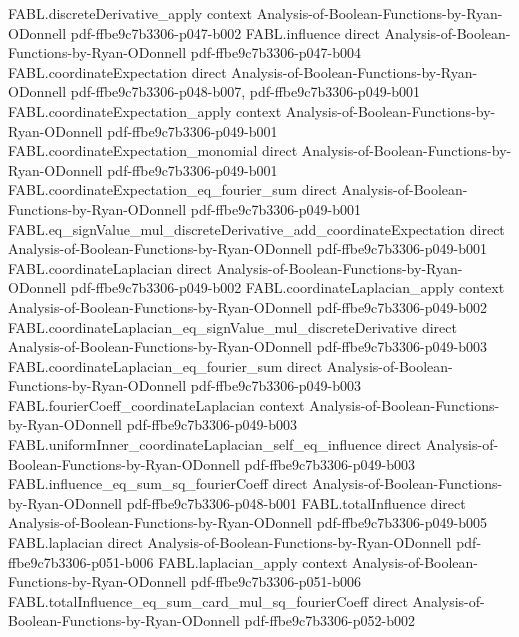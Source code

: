 \begin{theorem}
\proofstep
  {FABL.discreteDerivative_apply}
  {context}
  {Analysis-of-Boolean-Functions-by-Ryan-ODonnell}
  {pdf-ffbe9c7b3306-p047-b002}
\proofstep
  {FABL.influence}
  {direct}
  {Analysis-of-Boolean-Functions-by-Ryan-ODonnell}
  {pdf-ffbe9c7b3306-p047-b004}
\proofstep
  {FABL.coordinateExpectation}
  {direct}
  {Analysis-of-Boolean-Functions-by-Ryan-ODonnell}
  {pdf-ffbe9c7b3306-p048-b007,
    pdf-ffbe9c7b3306-p049-b001}
\proofstep
  {FABL.coordinateExpectation_apply}
  {context}
  {Analysis-of-Boolean-Functions-by-Ryan-ODonnell}
  {pdf-ffbe9c7b3306-p049-b001}
\proofstep
  {FABL.coordinateExpectation_monomial}
  {direct}
  {Analysis-of-Boolean-Functions-by-Ryan-ODonnell}
  {pdf-ffbe9c7b3306-p049-b001}
\proofstep
  {FABL.coordinateExpectation_eq_fourier_sum}
  {direct}
  {Analysis-of-Boolean-Functions-by-Ryan-ODonnell}
  {pdf-ffbe9c7b3306-p049-b001}
\proofstep
  {FABL.eq_signValue_mul_discreteDerivative_add_coordinateExpectation}
  {direct}
  {Analysis-of-Boolean-Functions-by-Ryan-ODonnell}
  {pdf-ffbe9c7b3306-p049-b001}
\proofstep
  {FABL.coordinateLaplacian}
  {direct}
  {Analysis-of-Boolean-Functions-by-Ryan-ODonnell}
  {pdf-ffbe9c7b3306-p049-b002}
\proofstep
  {FABL.coordinateLaplacian_apply}
  {context}
  {Analysis-of-Boolean-Functions-by-Ryan-ODonnell}
  {pdf-ffbe9c7b3306-p049-b002}
\proofstep
  {FABL.coordinateLaplacian_eq_signValue_mul_discreteDerivative}
  {direct}
  {Analysis-of-Boolean-Functions-by-Ryan-ODonnell}
  {pdf-ffbe9c7b3306-p049-b003}
\proofstep
  {FABL.coordinateLaplacian_eq_fourier_sum}
  {direct}
  {Analysis-of-Boolean-Functions-by-Ryan-ODonnell}
  {pdf-ffbe9c7b3306-p049-b003}
\proofstep
  {FABL.fourierCoeff_coordinateLaplacian}
  {context}
  {Analysis-of-Boolean-Functions-by-Ryan-ODonnell}
  {pdf-ffbe9c7b3306-p049-b003}
\proofstep
  {FABL.uniformInner_coordinateLaplacian_self_eq_influence}
  {direct}
  {Analysis-of-Boolean-Functions-by-Ryan-ODonnell}
  {pdf-ffbe9c7b3306-p049-b003}
\proofstep
  {FABL.influence_eq_sum_sq_fourierCoeff}
  {direct}
  {Analysis-of-Boolean-Functions-by-Ryan-ODonnell}
  {pdf-ffbe9c7b3306-p048-b001}
\proofstep
  {FABL.totalInfluence}
  {direct}
  {Analysis-of-Boolean-Functions-by-Ryan-ODonnell}
  {pdf-ffbe9c7b3306-p049-b005}
\proofstep
  {FABL.laplacian}
  {direct}
  {Analysis-of-Boolean-Functions-by-Ryan-ODonnell}
  {pdf-ffbe9c7b3306-p051-b006}
\proofstep
  {FABL.laplacian_apply}
  {context}
  {Analysis-of-Boolean-Functions-by-Ryan-ODonnell}
  {pdf-ffbe9c7b3306-p051-b006}
\proofstep
  {FABL.totalInfluence_eq_sum_card_mul_sq_fourierCoeff}
  {direct}
  {Analysis-of-Boolean-Functions-by-Ryan-ODonnell}
  {pdf-ffbe9c7b3306-p052-b002}

\end{theorem}
